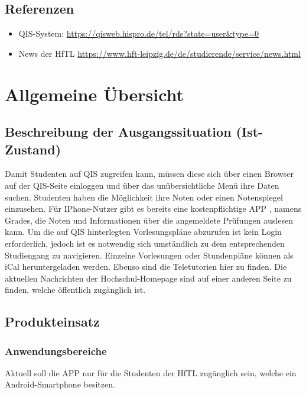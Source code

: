 \subsection{\textbf{Referenzen}}

\begin{itemize}		
	\item QIS-System:  \url{https://qisweb.hispro.de/tel/rds?state=user&type=0} 
	
	\item News der HfTL  \url{https://www.hft-leipzig.de/de/studierende/service/news.html}	
\end{itemize}


\section{Allgemeine Übersicht}

\subsection{\textbf{Beschreibung der Ausgangssituation (Ist-Zustand) }}

Damit Studenten auf \acs{QIS} zugreifen kann, müssen diese sich über einen Browser auf der \acs{QIS}-Seite einloggen und über das unübersichtliche Menü ihre Daten suchen.
Studenten haben die Möglichkeit ihre Noten oder einen Notenspiegel einzusehen.
Für IPhone-Nutzer gibt es bereits eine kostenpflichtige \acs{APP} , namens Grades, die Noten und Informationen über die angemeldete Prüfungen auslesen kann.
Um die auf \acs{QIS} hinterlegten Vorlesungspläne abzurufen ist kein Login erforderlich, jedoch ist es notwendig sich umständlich zu dem entsprechenden Studiengang zu navigieren. Einzelne Vorlesungen oder Stundenpläne können als \acs{iCal} heruntergeladen werden.
Ebenso sind die Teletutorien hier zu finden.
Die aktuellen Nachrichten der Hochschul-Homepage sind auf einer anderen Seite zu finden, welche öffentlich zugänglich ist.


\subsection{\textbf{Produkteinsatz}}

\subsubsection{Anwendungsbereiche}
Aktuell soll die APP nur für die Studenten der \acs{HfTL} zugänglich sein, welche ein Android-Smartphone besitzen. 

